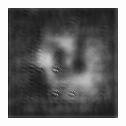 \begin{figure}[H]
\begin{subfigure}[t]{0.13\textwidth}
  \end{subfigure}
  \begin{subfigure}[t]{0.13\textwidth}
    \centering
    \includegraphics[width=\linewidth]{img/one-trial/prediction_2_adversarial.png}
  \end{subfigure}
  \\
    \vspace{0.1cm}
  

\end{figure}
